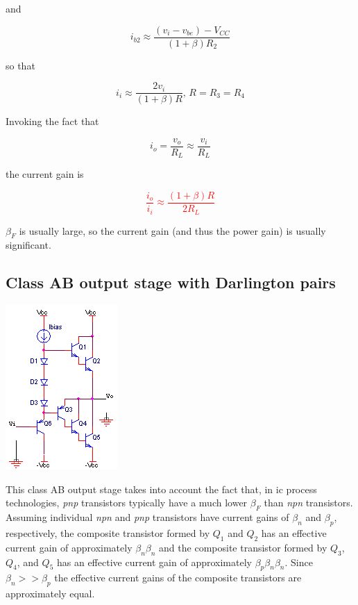 and

\begin{equation}
i_{b2} \approx \frac{(v_{i}-v_{be})-V_{CC}}{(1+\beta)R_2}
\end{equation}

so that

\begin{equation}
i_{i} \approx \frac{2v_{i}}{(1+\beta)R}\text{, }R = R_3 = R_4
\end{equation}

Invoking the fact that

\begin{equation}
i_{o} = \frac{v_{o}}{R_{L}} \approx \frac{v_{i}}{R_{L}}
\end{equation}

the current gain is

\textcolor{red}{
\begin{equation}
\frac{i_{o}}{i_{i}} \approx \frac{(1+\beta)R}{2R_{L}}
\end{equation}
}

$\beta_{F}$ is usually large, so the current gain (and thus the power gain) is usually significant. \autocite[598-599]{microelectronics-neaman}

\subsection{Class AB output stage with Darlington pairs}
\begin{center}
	\includegraphics{schematics/classABdarlington.PNG}
\end{center}
This class AB output stage takes into account the fact that, in \ac{ic} process technologies, \textit{pnp} transistors typically have a much lower $\beta_{F}$ than \textit{npn} transistors.
Assuming individual \textit{npn} and \textit{pnp} transistors have current gains of $\beta_{n}$ and $\beta_{p}$, respectively, the composite transistor formed by $Q_1$ and $Q_2$ has an effective current gain of approximately $\beta_{n}\beta_{n}$ and the composite transistor formed by $Q_3$, $Q_4$, and $Q_5$ has an effective current gain of approximately $\beta_{p}\beta_{n}\beta_{n}$.
Since $\beta_{n} >> \beta_{p}$ the effective current gains of the composite transistors are approximately equal. \autocite[601-602]{microelectronics-neaman}

